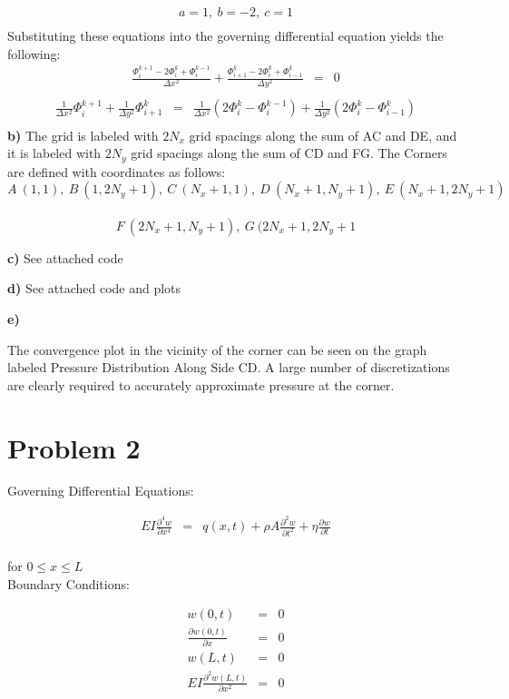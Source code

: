 \documentclass[a4paper]{article}
\begin{document}
\begin{eqnarray*}
a = 1, \ b = -2, \ c = 1\\
\end{eqnarray*}
Substituting these equations into the governing differential equation yields the following:
\begin{eqnarray*}
\frac{ \Phi^{k+1}_{i} - 2 \Phi^{k}_{i} + \Phi^{k-1}_{i} }{\Delta x^{2}} + \frac{ \Phi^{k}_{i+1} - 2 \Phi^{k}_{i} + \Phi^{k}_{i-1} }{\Delta y^{2}} & = & 0\\
\end{eqnarray*}
\begin{eqnarray*}
\frac{1}{\Delta x^{2}} \Phi^{k+1}_{i} + \frac{1}{\Delta y^{2}} \Phi^{k}_{i+1} & = & \frac{1}{\Delta x^{2}}(2\Phi^{k}_{i}-\Phi^{k-1}_{i}) + \frac{1}{\Delta y^{2}}(2\Phi^{k}_{i}-\Phi^{k}_{i-1})\\
\end{eqnarray*}
\textbf{b)} The grid is labeled with $2N_{x}$ grid spacings along the sum of AC and DE, and it is labeled with $2N_{y}$ grid spacings along the sum of CD and FG. The Corners are defined with coordinates as follows: $$A \ (1, 1), \ B \ (1, 2N_{y}+1), \ C \ (N_{x}+1, 1), \ D \ (N_{x}+1, N_{y}+1), \ E \ (N_{x}+1, 2N_{y}+1)$$\\
$$F \ (2N_{x}+1,N_{y}+1), \ G \ (2N_{x}+1, 2N_{y}+1$$

\textbf{c)} See attached code

\textbf{d)} See attached code and plots

\textbf{e)} 

The convergence plot in the vicinity of the corner can be seen on the graph labeled Pressure Distribution Along Side CD. A large number of discretizations are clearly required to accurately approximate pressure at the corner.
\section*{Problem 2}
Governing Differential Equations:

\begin{eqnarray*}
EI\frac{\partial ^{4} w}{\partial x^{4}} & = & q(x,t)+\rho A \frac{\partial ^{2} w}{\partial t^{2}} + \eta \frac{\partial w}{\partial t} \\
\end{eqnarray*}

for $0 \leq x \leq L$\\

Boundary Conditions:

\begin{eqnarray*}
w(0,t) & = & 0\\
\frac{\partial w(0,t)}{\partial x} & = & 0\\
w(L,t) & = & 0\\
EI\frac{\partial ^{2}w(L,t)}{\partial x^{2}} & = & 0\\
\end{eqnarray*}
\end{document}

